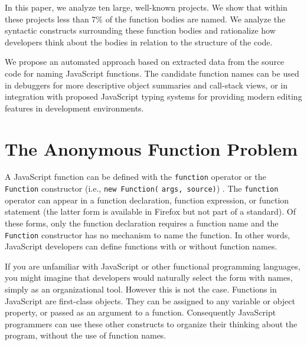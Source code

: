 \documentclass[10pt, preprint]{sigplanconf}
\begin{document}
In this paper, we analyze ten large, well-known projects. We show that within these projects less than 7\% of the function bodies are named. 
We analyze the syntactic constructs surrounding these function bodies and rationalize how developers think about the bodies in relation to the structure of the code.

We propose an automated approach based on extracted data from the source code for naming JavaScript functions. The candidate function names can be used in debuggers for more descriptive object summaries and call-stack views, or in integration with proposed JavaScript typing systems for providing modern editing features in development environments. 




\section{The Anonymous Function Problem}

A JavaScript function can be defined with the \verb|function| operator or the \verb|Function| constructor (i.e., \verb|new Function(| \verb|args, source)|) \cite{ECMA}. The \verb|function| operator can appear in a function declaration, function expression, or function statement (the latter form is available in Firefox but not part of a standard).  Of these forms, only the function declaration requires a function name and the \verb|Function| constructor has no mechanism to name the function.  In other words, JavaScript developers can define functions with or without function names.

If you are unfamiliar with JavaScript or other functional programming languages, you might imagine that developers would naturally select the form with names, simply as an organizational tool. However this is not the case. Functions in JavaScript are first-class objects. They can be assigned to any variable or object property, or passed as an argument to a function. Consequently JavaScript programmers can use these other constructs to organize their thinking about the program, without the use of function names.
\end{document}
